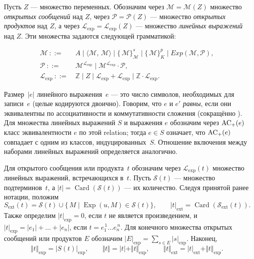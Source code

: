 \begin{definition}
Пусть $Z$ — множество переменных.
Обозначим через $\mathcal M=\mathcal M(Z)$
множество \emph{открытых сообщений} над $Z$,
через $\mathcal P=\mathcal P(Z)$ —
множество \emph{открытых продуктов} над $Z$,
а через $\mathcal L_{\text{exp}} = \mathcal L_{\text{exp}}(Z)$ —
множество \emph{линейных выражений} над $Z$.
Эти множества задаются следующей грамматикой:

\[
\begin{aligned}
  \mathcal M\ ::=&\ A \;\bigl|\;
                   \langle \mathcal M,\,\mathcal M\rangle \;\bigl|\;
                   \{\,\mathcal M\}^{s}_{\mathcal M}\;\bigl|\;
                   \{\,\mathcal M\}^{p}_{K}\;\bigl|\;
                   Exp(\mathcal M,\mathcal P),\\[2pt]
  \mathcal P\ ::=&\ \mathcal M^{\mathcal L_{\text{exp}}}\;\bigl|\;
                   \mathcal M^{\mathcal L_{\text{exp}}}\!\cdot\mathcal P,\\[2pt]
  \mathcal L_{\text{exp}}\ ::=&\ \mathbb Z \;\bigl|\;
                       Z \;\bigl|\;
                       \mathcal L_{\text{exp}}+\mathcal L_{\text{exp}} \;\bigl|\;
                       \mathbb Z\!\cdot\!\mathcal L_{\text{exp}}.
\end{aligned}
\]
\end{definition}

\noindent
Размер~$|e|$ линейного выражения~$e$ — это число символов,
необходимых для записи~$e$ (целые кодируются двоично).
Говорим, что $e$ и $e'$ \emph{равны},
если они эквивалентны по ассоциативности и коммутативности сложения
(сокращённо ).
Для множества линейных выражений $S$ и выражения $e$
обозначим через $\text{AC\textsubscript{+}}(e)$ класс эквивалентности $e$
по этой relation; тогда $e\in S$ означает,
что $\text{AC\textsubscript{+}}(e)$ совпадает с одним из классов, индуцированных~$S$.
Отношение включения между наборами линейных выражений определяется аналогично.

\smallskip
Для открытого сообщения или продукта~$t$
обозначим через $\mathcal L_{\text{exp}}(t)$
множество линейных выражений, встречающихся в~$t$.
Пусть $\mathcal S(t)$ — множество подтерминов~$t$,
а $|t|=\operatorname{Card}(\mathcal S(t))$ — их количество.
Следуя принятой ранее нотации, положим
\[
  S_{\text{ext}}(t)=\mathcal S(t)\cup\{\,M\mid \operatorname{Exp}(u,M)\in \mathcal S(t)\},
  \qquad
  |t|_{\text{ext}}=\operatorname{Card}(\mathcal S_{\text{ext}}(t)).
\]
Также определим
$|t|_{\text{exp}}=0$, если $t$ не является произведением,
и $|t|_{\text{exp}}=|e_{1}|+\dots+|e_{n}|$, если
$t = e_{1}^{\,1}\!\dots e_{n}^{\,n}$.
Для конечного множества открытых сообщений или продуктов $E$
обозначим $|E|_{\text{exp}}=\sum_{s\in E}|s|_{\text{exp}}$.
Наконец,
\[
  \Vert t\Vert_{\text{exp}} = |S(t)|_{\text{exp}},\qquad
  \Vert t\Vert = |t| + \Vert t\Vert_{\text{exp}},\qquad
  \Vert t\Vert_{\text{ext}} = |t|_{\text{ext}} + \Vert t\Vert_{\text{exp}}.
\]

